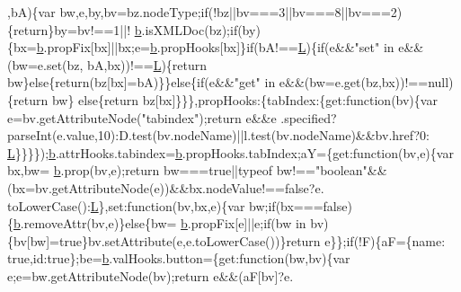 \begin{DoxyCode}
      ,bA)\{var bw,e,by,bv=bz.nodeType;\textcolor{keywordflow}{if}(!bz||bv===3||bv===8||bv===2)\{\textcolor{keywordflow}{return}\}by=bv!==1||!
      \hyperlink{jquery_8js_aa4026ad5544b958e54ce5e106fa1c805}{b}.isXMLDoc(bz);\textcolor{keywordflow}{if}(by)\{bx=\hyperlink{jquery_8js_aa4026ad5544b958e54ce5e106fa1c805}{b}.propFix[bx]||bx;e=\hyperlink{jquery_8js_aa4026ad5544b958e54ce5e106fa1c805}{b}.propHooks[bx]\}\textcolor{keywordflow}{if}(bA!==\hyperlink{jquery_8js_a38ee4c0b5f4fe2a18d0c783af540d253}{L})\{\textcolor{keywordflow}{if}(e&&\textcolor{stringliteral}{"set"} in e&&(bw=e.set(bz,
      bA,bx))!==\hyperlink{jquery_8js_a38ee4c0b5f4fe2a18d0c783af540d253}{L})\{\textcolor{keywordflow}{return} bw\}\textcolor{keywordflow}{else}\{\textcolor{keywordflow}{return}(bz[bx]=bA)\}\}\textcolor{keywordflow}{else}\{\textcolor{keywordflow}{if}(e&&\textcolor{stringliteral}{"get"} in e&&(bw=e.get(bz,bx))!==null)\{\textcolor{keywordflow}{return} bw\}\textcolor{keywordflow}{
      else}\{\textcolor{keywordflow}{return} bz[bx]\}\}\},propHooks:\{tabIndex:\{\textcolor{keyword}{get}:\textcolor{keyword}{function}(bv)\{var e=bv.getAttributeNode(\textcolor{stringliteral}{"tabindex"});\textcolor{keywordflow}{return} e&&e
      .specified?parseInt(e.value,10):D.test(bv.nodeName)||l.test(bv.nodeName)&&bv.href?0:
      \hyperlink{jquery_8js_a38ee4c0b5f4fe2a18d0c783af540d253}{L}\}\}\}\});\hyperlink{jquery_8js_aa4026ad5544b958e54ce5e106fa1c805}{b}.attrHooks.tabindex=\hyperlink{jquery_8js_aa4026ad5544b958e54ce5e106fa1c805}{b}.propHooks.tabIndex;aY=\{\textcolor{keyword}{get}:\textcolor{keyword}{function}(bv,e)\{var bx,bw=
      \hyperlink{jquery_8js_aa4026ad5544b958e54ce5e106fa1c805}{b}.prop(bv,e);\textcolor{keywordflow}{return} bw===\textcolor{keyword}{true}||typeof bw!==\textcolor{stringliteral}{"boolean"}&&(bx=bv.getAttributeNode(e))&&bx.nodeValue!==\textcolor{keyword}{false}?e.
      toLowerCase():\hyperlink{jquery_8js_a38ee4c0b5f4fe2a18d0c783af540d253}{L}\},\textcolor{keyword}{set}:\textcolor{keyword}{function}(bv,bx,e)\{var bw;\textcolor{keywordflow}{if}(bx===\textcolor{keyword}{false})\{\hyperlink{jquery_8js_aa4026ad5544b958e54ce5e106fa1c805}{b}.removeAttr(bv,e)\}\textcolor{keywordflow}{else}\{bw=
      \hyperlink{jquery_8js_aa4026ad5544b958e54ce5e106fa1c805}{b}.propFix[e]||e;\textcolor{keywordflow}{if}(bw in bv)\{bv[bw]=\textcolor{keyword}{true}\}bv.setAttribute(e,e.toLowerCase())\}\textcolor{keywordflow}{return} e\}\};\textcolor{keywordflow}{if}(!F)\{aF=\{name:\textcolor{keyword}{
      true},\textcolor{keywordtype}{id}:\textcolor{keyword}{true}\};be=\hyperlink{jquery_8js_aa4026ad5544b958e54ce5e106fa1c805}{b}.valHooks.button=\{\textcolor{keyword}{get}:\textcolor{keyword}{function}(bw,bv)\{var e;e=bw.getAttributeNode(bv);\textcolor{keywordflow}{return} e&&(aF[bv]?e.

\end{DoxyCode}
